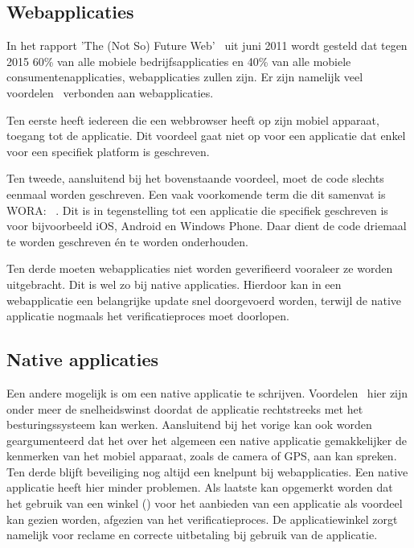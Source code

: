 \subsection{Webapplicaties}
In het rapport 'The (Not So) Future Web'~\cite{Phifer2011} uit juni 2011 wordt gesteld dat tegen 2015 60\% van alle mobiele bedrijfsapplicaties en 40\% van alle mobiele consumentenapplicaties, webapplicaties zullen zijn. 
Er zijn namelijk veel voordelen~\cite{Accenture2012} verbonden aan webapplicaties.

Ten eerste heeft iedereen die een webbrowser heeft op zijn mobiel apparaat, toegang tot de applicatie.  
Dit voordeel gaat niet op voor een  applicatie dat enkel voor een specifiek platform is geschreven. 

Ten tweede, aansluitend bij het bovenstaande voordeel, moet de code slechts eenmaal worden geschreven. 
Een vaak voorkomende term die dit samenvat is WORA: ~\cite{Hales2012}. 
Dit is in tegenstelling tot een  applicatie die specifiek geschreven is voor bijvoorbeeld iOS, Android en Windows Phone. 
Daar dient de code driemaal te worden geschreven én te worden onderhouden.

Ten derde moeten webapplicaties niet worden geverifieerd vooraleer ze worden uitgebracht. 
Dit is wel zo bij native applicaties. 
Hierdoor kan in een webapplicatie een belangrijke update snel doorgevoerd worden, terwijl de native applicatie nogmaals het verificatieproces moet doorlopen.

\subsection{Native applicaties}
Een andere mogelijk is om een native applicatie te schrijven. 
Voordelen~\cite{Accenture2012} hier zijn onder meer de snelheidswinst doordat de applicatie rechtstreeks met het besturingssysteem kan werken. 
Aansluitend bij het vorige kan ook worden geargumenteerd dat het over het algemeen een native applicatie gemakkelijker de kenmerken van het mobiel apparaat, zoals de camera of GPS, aan kan spreken. 
Ten derde blijft beveiliging nog altijd een knelpunt bij webapplicaties. Een native applicatie heeft hier minder problemen. 
Als laatste kan opgemerkt worden dat het gebruik van een winkel () voor het aanbieden van een applicatie als voordeel kan gezien worden, afgezien van het verificatieproces. 
De applicatiewinkel zorgt namelijk voor reclame en correcte uitbetaling bij gebruik van de applicatie.

